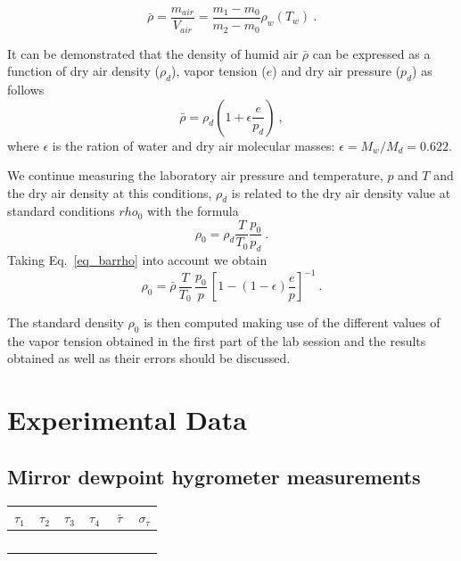 \documentclass{article}
\begin{document}
{\Large
\begin{equation} 
\bar\rho = \frac{m_{air}}{V_{air}} =\frac{m_1-m_0}{m_2-m_0} \rho_{w}(T_w)~.
\end{equation}
}

It can be demonstrated that the density of humid air $\bar\rho$ can be expressed as a function of dry air density ($\rho_d$), vapor tension ($e$) and dry air pressure ($p_d$) as follows
\begin{equation} 
\bar \rho  = \rho_d \left( 1  +  \epsilon \frac{e}{p_d} \right)~,
\label{eq_barrho}
\end{equation}
\noindent where $\epsilon$ is the ration of water and dry air molecular masses: $\epsilon = M_w/M_d = 0.622$.

We continue measuring the laboratory air pressure and temperature, $p$ and $T$ and the dry air density at this conditions, $\rho_d$ is related to the dry air density value at standard conditions $rho_0$ with the formula
\begin{equation} 
\rho_0 = \rho_d  \frac{T}{T_0}  \frac{p_0}{p_d}~.
\end{equation} 
Taking Eq.\ \eqref{eq_barrho} into account we obtain
{\Large
\begin{equation} 
\rho_0 = \bar\rho \, \frac{T}{T_0} \, \frac{p_0}{p} \,
\left[
1 - (1-\epsilon) \frac{e}{p}
\right]^{-1}~.
\end{equation}
}

The  standard density  $\rho_0$ is  then  computed making  use of  the
different values  of the vapor tension  obtained in the first  part of
the  lab session  and the  results obtained  as well  as their  errors
should be discussed.

\section{Experimental Data}

\subsection{Mirror dewpoint hygrometer measurements}

\begin{tabular}{|c|c|c|c|c|c|}
\hline
$\tau_1$&$\tau_2$&$\tau_3$&$\tau_4$&$\bar \tau$ &$\sigma_\tau$\\
\hline
~\hspace{2.25cm}~&~\hspace{2.25cm}~&~\hspace{2.25cm}~&~\hspace{2.25cm}~&~\hspace{2.5cm}~&~\hspace{2.5cm}~\\
\hline
\end{tabular}
\end{document}
